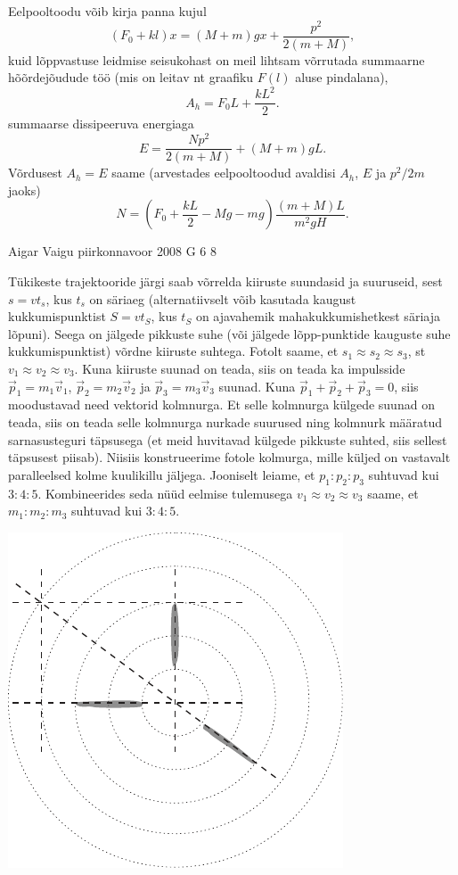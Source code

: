 \documentclass[11pt]{article}
\begin{document}
{{Eelpooltoodu võib kirja panna kujul
\[
(F_0 + kl)x = (M + m) gx + \frac{p^2}{2(m+M)},
\]
kuid lõppvastuse leidmise seisukohast on meil lihtsam võrrutada summaarne hõõrdejõudude töö (mis on leitav nt graafiku $F(l)$ aluse pindalana),
\[
A_h = F_0L + \frac{kL^2}{2}.
\]
summaarse dissipeeruva energiaga
\[
E=\frac{N p^{2}}{2(m+M)}+(M+m) g L.
\]
Võrdusest $A_h = E$ saame (arvestades eelpooltoodud avaldisi $A_h$, $E$ ja $p^2/2m$ jaoks)
\[
N=\left(F_{0}+\frac{k L}{2}-M g-m g\right) \frac{(m+M) L}{m^{2} g H}.
\]
\fi
}

{Aigar Vaigu} %
{piirkonnavoor} %
{2008} %
{G 6} %
{8} %
{

\ifSolution
Tükikeste trajektooride järgi saab võrrelda kiiruste suundasid ja suuruseid, sest $s = vt_s$, kus $t_s$ on säriaeg (alternatiivselt võib kasutada kaugust kukkumispunktist $S = vt_S$, kus $t_S$ on ajavahemik mahakukkumishetkest säriaja lõpuni). Seega on jälgede pikkuste suhe (või jälgede lõpp-punktide kauguste suhe kukkumispunktist) võrdne kiiruste suhtega. Fotolt saame, et $s_1 \approx s_2 \approx s_3$, st $v_1 \approx v_2 \approx v_3$. Kuna kiiruste suunad on teada, siis on teada ka impulsside $\vec p_1 = m_1\vec v_1$, $\vec p_2 = m_2\vec v_2$ ja $\vec p_3 = m_3\vec v_3$ suunad. Kuna $\vec p_1 + \vec p_2 + \vec p_3 = 0$, siis moodustavad need vektorid kolmnurga. Et selle kolmnurga külgede suunad on teada, siis on teada selle kolmnurga nurkade suurused ning kolmnurk määratud sarnasusteguri täpsusega (et meid huvitavad külgede pikkuste suhted, siis sellest täpsusest piisab). Niisiis konstrueerime fotole kolmurga, mille küljed on vastavalt paralleelsed kolme kuulikillu jäljega. Jooniselt leiame, et $p_1 : p_2 : p_3$ suhtuvad kui $3 : 4 : 5$. Kombineerides seda nüüd eelmise tulemusega $v_1 \approx v_2 \approx v_3$ saame, et $m_1 : m_2 : m_3$ suhtuvad kui $3 : 4 : 5$.
\begin{center}
	\includegraphics[width=0.6\linewidth]{2008-v2g-06-lah}
\end{center}
\fi
}

}
\end{document}
